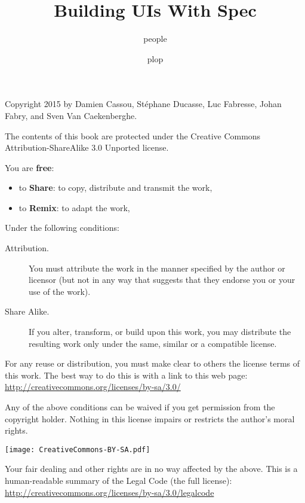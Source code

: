 \documentclass[10pt,twoside,english]{support/latex/sbabook/sbabook}
\title{Building UIs With Spec}
\author{people}
\date{plop}
\begin{document}
\maketitle
\pagestyle{titlingpage}
\thispagestyle{titlingpage} %

\cleartoverso
{\small

  Copyright 2015 by Damien Cassou, Stéphane Ducasse, Luc Fabresse, Johan Fabry,
  and Sven Van Caekenberghe.

  The contents of this book are protected under the Creative Commons
  Attribution-ShareAlike 3.0 Unported license.

  You are \textbf{free}:
  \begin{itemize}
  \item to \textbf{Share}: to copy, distribute and transmit the work,
  \item to \textbf{Remix}: to adapt the work,
  \end{itemize}

  Under the following conditions:
  \begin{description}
  \item[Attribution.] You must attribute the work in the manner specified by the
    author or licensor (but not in any way that suggests that they endorse you
    or your use of the work).
  \item[Share Alike.] If you alter, transform, or build upon this work, you may
    distribute the resulting work only under the same, similar or a compatible
    license.
  \end{description}

  For any reuse or distribution, you must make clear to others the
  license terms of this work. The best way to do this is with a link to
  this web page: \\
  \url{http://creativecommons.org/licenses/by-sa/3.0/}

  Any of the above conditions can be waived if you get permission from
  the copyright holder. Nothing in this license impairs or restricts the
  author's moral rights.

  \begin{center}
    \texttt{[image: CreativeCommons-BY-SA.pdf]}
  \end{center}

  Your fair dealing and other rights are in no way affected by the
  above. This is a human-readable summary of the Legal Code (the full
  license): \\
  \url{http://creativecommons.org/licenses/by-sa/3.0/legalcode}

}
\end{document}
